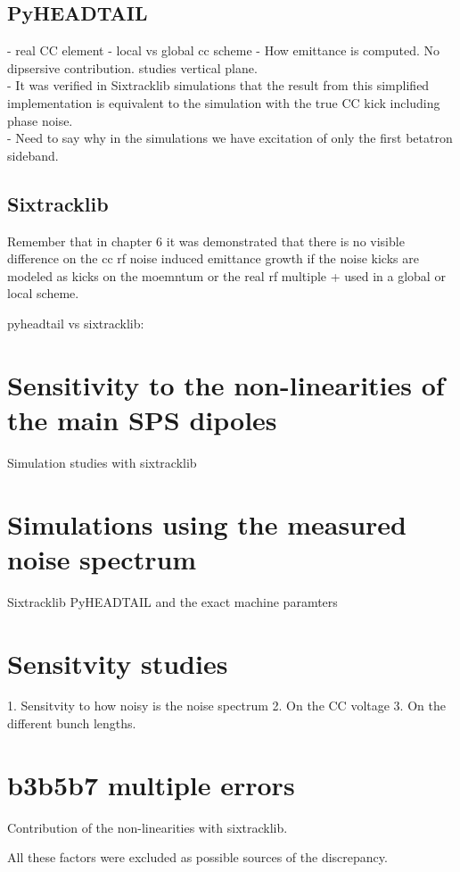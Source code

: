 \subsection{PyHEADTAIL}
- real CC element
- local vs global cc scheme
- How emittance is computed. No dipsersive contribution. studies vertical plane. \\
- It was verified in Sixtracklib simulations that the result from this simplified implementation is equivalent to the simulation with the true CC kick including phase noise.\\
- Need to say why in the simulations we have excitation of only the first betatron sideband. \\
\subsection{Sixtracklib}

Remember that in chapter 6 it was demonstrated that there is no visible difference on the cc rf noise induced emittance growth if the noise kicks are modeled as kicks on the moemntum or the real rf multiple + used in a global or local scheme.


pyheadtail vs sixtracklib: %

\section{Sensitivity to the non-linearities of the main SPS dipoles}
Simulation studies with sixtracklib

\section{Simulations using the measured noise spectrum}
Sixtracklib PyHEADTAIL and the exact machine paramters

\section{Sensitvity studies}
1. Sensitvity to how noisy is the noise spectrum
2. On the CC voltage
3. On the different bunch lengths. 

\section{b3b5b7 multiple errors}
Contribution of the non-linearities with sixtracklib.


All these factors were excluded as possible sources of the discrepancy.